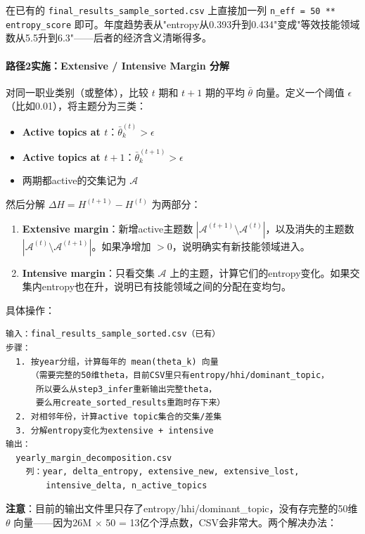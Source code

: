 \documentclass[12pt,a4paper]{ctexart}
\begin{document}
在已有的 \texttt{final\_results\_sample\_sorted.csv} 上直接加一列 \texttt{n\_eff = 50 ** entropy\_score} 即可。年度趋势表从"entropy从0.393升到0.434"变成"等效技能领域数从5.5升到6.3"——后者的经济含义清晰得多。

\paragraph{路径2实施：Extensive / Intensive Margin 分解}

对同一职业类别（或整体），比较 $t$ 期和 $t+1$ 期的平均 $\bar{\theta}$ 向量。定义一个阈值 $\epsilon$（比如0.01），将主题分为三类：

\begin{itemize}
\item \textbf{Active topics at $t$}：$\bar{\theta}^{(t)}_k > \epsilon$
\item \textbf{Active topics at $t+1$}：$\bar{\theta}^{(t+1)}_k > \epsilon$
\item 两期都active的交集记为 $\mathcal{A}$
\end{itemize}

然后分解 $\Delta H = H^{(t+1)} - H^{(t)}$ 为两部分：

\begin{enumerate}
\item \textbf{Extensive margin}：新增active主题数 $|\mathcal{A}^{(t+1)} \setminus \mathcal{A}^{(t)}|$，以及消失的主题数 $|\mathcal{A}^{(t)} \setminus \mathcal{A}^{(t+1)}|$。如果净增加 $> 0$，说明确实有新技能领域进入。
\item \textbf{Intensive margin}：只看交集 $\mathcal{A}$ 上的主题，计算它们的entropy变化。如果交集内entropy也在升，说明已有技能领域之间的分配在变均匀。
\end{enumerate}

具体操作：

\begin{verbatim}
输入：final_results_sample_sorted.csv（已有）
步骤：
  1. 按year分组，计算每年的 mean(theta_k) 向量
     （需要完整的50维theta，目前CSV里只有entropy/hhi/dominant_topic，
      所以要么从step3_infer重新输出完整theta，
      要么用create_sorted_results重跑时存下来）
  2. 对相邻年份，计算active topic集合的交集/差集
  3. 分解entropy变化为extensive + intensive
输出：
  yearly_margin_decomposition.csv
    列：year, delta_entropy, extensive_new, extensive_lost,
        intensive_delta, n_active_topics
\end{verbatim}

\textbf{注意}：目前的输出文件里只存了entropy/hhi/dominant\_topic，没有存完整的50维 $\theta$ 向量——因为26M $\times$ 50 = 13亿个浮点数，CSV会非常大。两个解决办法：
\end{document}
